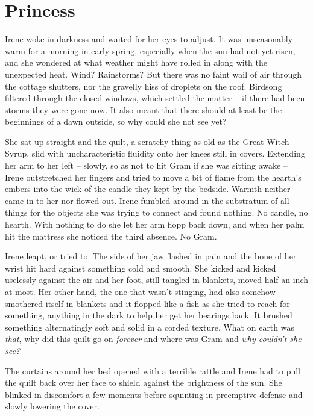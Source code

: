 \documentclass[../FGP.tex]{subfiles}
\begin{document}
\setmarginpargeometry
\section{Princess}
\begin{fragment}
Irene woke in darkness and waited for her eyes to adjust. It was unseasonably warm for a morning in early spring, especially when the sun had not yet risen, and she wondered at what weather might have rolled in along with the unexpected heat. Wind? Rainstorms? But there was no faint wail of air through the cottage shutters, nor the gravelly hiss of droplets on the roof. Birdsong filtered through the closed windows, which settled the matter -- if there had been storms they were gone now. It also meant that there should at least be the beginnings of a dawn outside, so why could she not see yet?

She sat up straight and the quilt, a scratchy thing as old as the Great Witch Syrup, slid with uncharacteristic fluidity onto her knees still in covers. Extending her arm to her left -- slowly, so as not to hit Gram if she was sitting awake -- Irene outstretched her fingers and tried to move a bit of flame from the hearth's embers into the wick of the candle they kept by the bedside. Warmth neither came in to her nor flowed out. Irene fumbled around in the substratum of all things for the objects she was trying to connect and found nothing. No candle, no hearth. With nothing to do she let her arm flopp back down, and when her palm hit the mattress she noticed the third absence. No Gram.

Irene leapt, or tried to. The side of her jaw flashed in pain and the bone of her wrist hit hard against something cold and smooth. She kicked and kicked uselessly against the air and her foot, still tangled in blankets, moved half an inch at most. Her other hand, the one that wasn't stinging, had also somehow smothered itself in blankets and it flopped like a fish as she tried to reach for something, anything in the dark to help her get her bearings back. It brushed something alternatingly soft and solid in a corded texture. What on earth was \emph{that}, why did this quilt go on \emph{forever} and where was Gram and \emph{why couldn't she see?} 

The curtains around her bed opened with a terrible rattle and Irene had to pull the quilt back over her face to shield against the brightness of the sun. She blinked in discomfort a few moments before squinting in preemptive defense and slowly lowering the cover.


\end{fragment}
\end{document}
